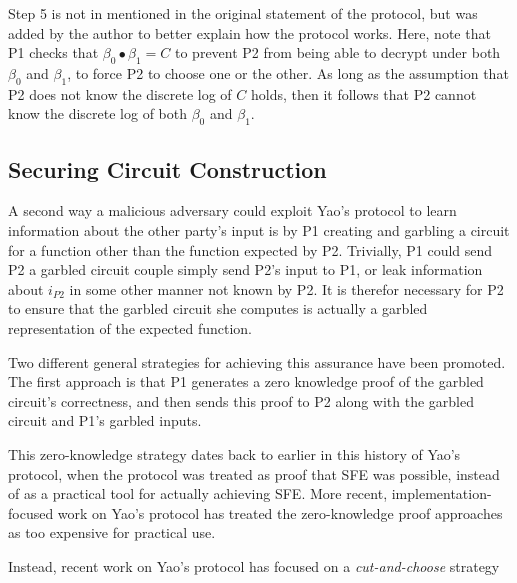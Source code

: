 Step 5 is not in mentioned in the original\cite{bellare1990non} statement of the protocol, but was added by the author to better explain how the protocol works. Here, note that \ac{P1} checks that $\beta_0 \bullet \beta_1 = C$ to prevent \ac{P2} from being able to decrypt under both $\beta_0$ and $\beta_1$, to force \ac{P2} to choose one or the other. As long as the assumption that \ac{P2} does not know the discrete log of $C$ holds, then it follows that \ac{P2} cannot know the discrete log of both $\beta_0$ and $\beta_1$.

\subsection{Securing Circuit Construction}

A second way a malicious adversary could exploit Yao's protocol to learn information about the other party's input is by \ac{P1} creating and garbling a circuit for a function other than the function expected by \ac{P2}. Trivially, \ac{P1} could send \ac{P2} a garbled circuit couple simply send \ac{P2}'s input to \ac{P1}, or leak information about $i_{P2}$ in some other manner not known by \ac{P2}.  It is therefor necessary for \ac{P2} to ensure that the garbled circuit she computes is actually a garbled representation of the expected function.

Two different general strategies for achieving this assurance have been promoted.  The first approach is that \ac{P1} generates a zero knowledge proof of the garbled circuit's correctness, and then sends this proof to \ac{P2} along with the garbled circuit and \ac{P1}'s garbled inputs\cite{goldreich1987play, goldreich2009foundations}.

This zero-knowledge strategy dates back to earlier in this history of Yao's protocol, when the protocol was treated as proof that \ac{SFE} was possible, instead of as a practical tool for actually achieving \ac{SFE}. More recent, implementation-focused work on Yao's protocol has treated the zero-knowledge proof approaches as too expensive for practical use\cite{lindell2007efficient, mohassel2006efficiency}.

Instead, recent work on Yao's protocol has focused on a \emph{cut-and-choose} strategy


